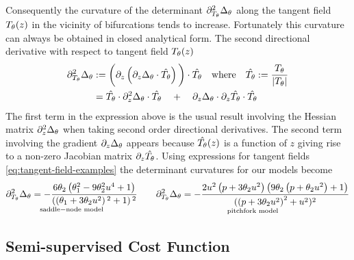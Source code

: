 Consequently the curvature of the determinant $\partial_{T_{\theta}}^2\Delta_{\theta}$ along the tangent field $T_{\theta}(z)$ in the vicinity of bifurcations tends to increase. Fortunately this curvature can always be obtained in closed analytical form. The second directional derivative with respect to tangent field $T_{\theta}(z)$
\begin{align}
    \partial_{T_{\theta}}^2\Delta_{\theta} &:=
    \bigg(
        \partial_z\left(
            \partial_z\Delta_{\theta} \cdot \hat{T_{\theta}}
        \right)
    \bigg)\cdot \hat{T_{\theta}}\quad
    \mathrm{where} \quad \hat{T_{\theta}}:=\frac{T_{\theta}}{|T_{\theta}|}\\
    &=
    \hat{T_{\theta}}\cdot\partial_z^2\Delta_{\theta}\cdot\hat{T_{\theta}}
    \quad+\quad
    \partial_z\Delta_{\theta}\cdot\partial_z\hat{T_{\theta}}\cdot\hat{T_{\theta}}
\end{align}
The first term in the expression above is the usual result involving the Hessian matrix $\partial_z^2\Delta_{\theta}$ when taking second order directional derivatives. The second term involving the gradient $\partial_z\Delta_{\theta}$ appears because $\hat{T_{\theta}}(z)$ is a function of $z$ giving rise to a non-zero Jacobian matrix $\partial_z \hat{T_{\theta}}$. Using expressions for tangent fields \eqref{eq:tangent-field-examples} the determinant curvatures for our models become
\begin{align}
    \underset{\mathrm{saddle-node\,\,model}}{
    \partial_{T_{\theta}}^2\Delta_{\theta} =
    -\frac{6 \theta_2 \left(\theta _1^2-9 \theta _2^2 u^4+1\right)}
    {\left(\left(\theta _1+3 \theta _2 u^2\right){}^2+1\right){}^2}}
    \qquad
    \underset{\mathrm{pitchfork\,\,model}}{
    \partial_{T_{\theta}}^2\Delta_{\theta} =
    -\frac{2 u^2 \left(p+3 \theta _2 u^2\right) \left(9 \theta _2 \left(p+\theta _2 u^2\right)+1\right)}{
    ( \left(p+3 \theta _2 u^2\right)^2+u^2 )^2
    }}
\end{align}

\subsection{Semi-supervised Cost Function}

